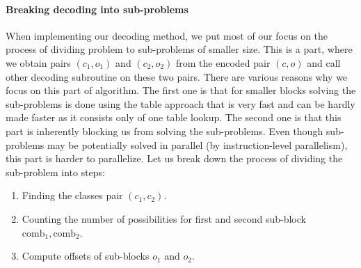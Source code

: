 \paragraph{Breaking decoding into sub-problems}

When implementing our decoding method, we put most of our focus on the process of dividing problem to
sub-problems of smaller size. This is a part, where we obtain pairs $(c_1, o_1)$ and $(c_2, o_2)$
from the encoded pair $(c, o)$ and call other decoding subroutine on these two pairs.
There are various reasons why we focus on this part of algorithm. The first one is that for smaller blocks 
solving the sub-problems is done using the table approach that is very fast and can be hardly
made faster as it consists only of one table lookup. The second one is that this part is
inherently blocking us from solving the sub-problems. Even though sub-problems may be potentially
solved in parallel (by instruction-level parallelism), this part is harder to parallelize. Let us break down
the process of dividing the sub-problem into steps:

\begin{enumerate}
	\item Finding the classes pair $(c_1, c_2)$.
	\item Counting the number of possibilities for first and second sub-block $\text{comb}_1, \text{comb}_2$.
	\item Compute offsets of sub-blocks $o_1$ and $o_2$.
\end{enumerate}

